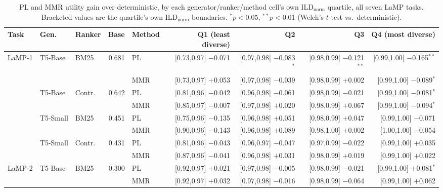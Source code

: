 \documentclass[10pt,twocolumn]{article}
\begin{document}
\begin{table}[t]
\centering
\scriptsize
\caption{PL and MMR utility gain over deterministic, by each generator/ranker/method
cell's own ILD$_{\text{norm}}$ quartile, all seven LaMP tasks. Bracketed values are
the quartile's own ILD$_{\text{norm}}$ boundaries. $^*p{<}0.05$, $^{**}p{<}0.01$
(Welch's $t$-test vs.\ deterministic).}
\label{tab:ild-quartiles-full}
\begin{tabular}{@{}lllrlrrrr@{}}
\toprule
Task & Gen. & Ranker & Base & Method & Q1 (least diverse) & Q2 & Q3 & Q4 (most diverse) \\
\midrule
\multirow{2}{*}{LaMP-1} & \multirow{2}{*}{T5-Base} & \multirow{2}{*}{BM25} & \multirow{2}{*}{0.681} & PL & [0.73,0.97] $-$0.071 & [0.97,0.98] $-$0.083$^{*}$ & [0.98,0.99] $-$0.121$^{**}$ & [0.99,1.00] $-$0.165$^{**}$ \\
 & & & & MMR & [0.73,0.97] $+$0.053 & [0.97,0.98] $-$0.039 & [0.98,0.99] $+$0.002 & [0.99,1.00] $-$0.089$^{*}$ \\
\cmidrule(lr){1-9}
 & \multirow{2}{*}{T5-Base} & \multirow{2}{*}{Contr.} & \multirow{2}{*}{0.642} & PL & [0.81,0.96] $-$0.042 & [0.96,0.98] $-$0.061 & [0.98,0.99] $-$0.021 & [0.99,1.00] $-$0.081$^{*}$ \\
 & & & & MMR & [0.85,0.97] $-$0.007 & [0.97,0.98] $+$0.020 & [0.98,0.99] $+$0.067 & [0.99,1.00] $-$0.094$^{*}$ \\
\cmidrule(lr){1-9}
 & \multirow{2}{*}{T5-Small} & \multirow{2}{*}{BM25} & \multirow{2}{*}{0.451} & PL & [0.75,0.96] $-$0.135 & [0.96,0.98] $+$0.051 & [0.98,0.99] $+$0.047 & [0.99,1.00] $-$0.071 \\
 & & & & MMR & [0.90,0.96] $-$0.143 & [0.96,0.98] $+$0.089 & [0.98,1.00] $+$0.002 & [1.00,1.00] $-$0.054 \\
\cmidrule(lr){1-9}
 & \multirow{2}{*}{T5-Small} & \multirow{2}{*}{Contr.} & \multirow{2}{*}{0.431} & PL & [0.81,0.96] $-$0.043 & [0.96,0.97] $-$0.047 & [0.97,0.99] $-$0.022 & [0.99,1.00] $+$0.035 \\
 & & & & MMR & [0.87,0.96] $-$0.041 & [0.96,0.98] $+$0.031 & [0.98,0.99] $+$0.019 & [0.99,1.00] $+$0.022 \\
\midrule
\multirow{2}{*}{LaMP-2} & \multirow{2}{*}{T5-Base} & \multirow{2}{*}{BM25} & \multirow{2}{*}{0.300} & PL & [0.92,0.97] $+$0.021 & [0.97,0.98] $-$0.005 & [0.98,0.99] $-$0.021 & [0.99,1.00] $+$0.081$^{*}$ \\
 & & & & MMR & [0.92,0.97] $+$0.032 & [0.97,0.98] $-$0.016 & [0.98,0.99] $-$0.064 & [0.99,1.00] $+$0.062 \\

\end{tabular}
\end{table}
\end{document}
